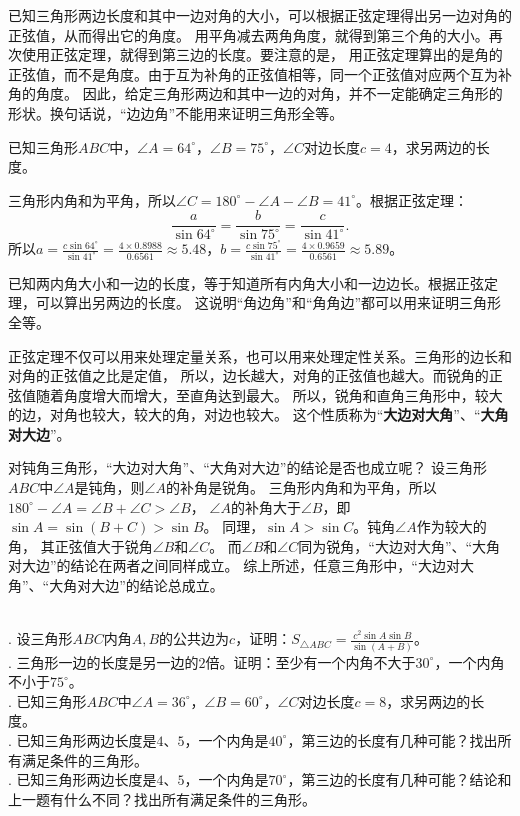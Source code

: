 \documentclass[12pt,UTF8]{ctexbook}
\begin{document}
已知三角形两边长度和其中一边对角的大小，可以根据正弦定理得出另一边对角的正弦值，从而得出它的角度。
用平角减去两角角度，就得到第三个角的大小。再次使用正弦定理，就得到第三边的长度。要注意的是，
用正弦定理算出的是角的正弦值，而不是角度。由于互为补角的正弦值相等，同一个正弦值对应两个互为补角的角度。
因此，给定三角形两边和其中一边的对角，并不一定能确定三角形的形状。换句话说，“边边角”不能用来证明三角形全等。

\begin{ex}\label{ex:2-1-20}
    已知三角形$ABC$中，$\angle A = 64^\circ$，$\angle B = 75^\circ$，$\angle C$对边长度$c=4$，求另两边的长度。
\end{ex}
\begin{so}
    三角形内角和为平角，所以$\angle C = 180^\circ - \angle A - \angle B = 41^\circ$。根据正弦定理：
    $$ \frac{a}{\sin 64^\circ} = \frac{b}{\sin 75^\circ} = \frac{c}{\sin 41^\circ}.$$
    所以$a = \frac{c \sin 64^\circ}{\sin 41^\circ} = \frac{4 \times 0.8988}{0.6561} \approx 5.48 $，$b = \frac{c \sin 75^\circ}{\sin 41^\circ} = \frac{4 \times 0.9659}{0.6561} \approx 5.89 $。
\end{so}

已知两内角大小和一边的长度，等于知道所有内角大小和一边边长。根据正弦定理，可以算出另两边的长度。
这说明“角边角”和“角角边”都可以用来证明三角形全等。

正弦定理不仅可以用来处理定量关系，也可以用来处理定性关系。三角形的边长和对角的正弦值之比是定值，
所以，边长越大，对角的正弦值也越大。而锐角的正弦值随着角度增大而增大，至直角达到最大。
所以，锐角和直角三角形中，较大的边，对角也较大，较大的角，对边也较大。
这个性质称为“\textbf{大边对大角}”、“\textbf{大角对大边}”。

对钝角三角形，“大边对大角”、“大角对大边”的结论是否也成立呢？
设三角形$ABC$中$\angle A$是钝角，则$\angle A$的补角是锐角。
三角形内角和为平角，所以$180^\circ - \angle A = \angle B + \angle C > \angle B$，
$\angle A$的补角大于$\angle B$，即$\sin A = \sin (B + C) > \sin B$。
同理，$\sin A > \sin C$。钝角$\angle A$作为较大的角，
其正弦值大于锐角$\angle B$和$\angle C$。
而$\angle B$和$\angle C$同为锐角，“大边对大角”、“大角对大边”的结论在两者之间同样成立。
综上所述，任意三角形中，“大边对大角”、“大角对大边”的结论总成立。

\begin{xt}\label{xt:2-1-10}
    \mbox{} \\
    . 设三角形$ABC$内角$A,B$的公共边为$c$，证明：$S_{\triangle ABC} = \frac{c^2\sin A\sin B}{\sin (A+B)}$。 \\
    . 三角形一边的长度是另一边的$2$倍。证明：至少有一个内角不大于$30^\circ$，一个内角不小于$75^\circ$。 \\
    . 已知三角形$ABC$中$\angle A = 36^\circ$，$\angle B = 60^\circ$，$\angle C$对边长度$c = 8$，求另两边的长度。 \\
    . 已知三角形两边长度是$4$、$5$，一个内角是$40^\circ$，第三边的长度有几种可能？找出所有满足条件的三角形。 \\
    . 已知三角形两边长度是$4$、$5$，一个内角是$70^\circ$，第三边的长度有几种可能？结论和上一题有什么不同？找出所有满足条件的三角形。
\end{xt}
\end{document}
